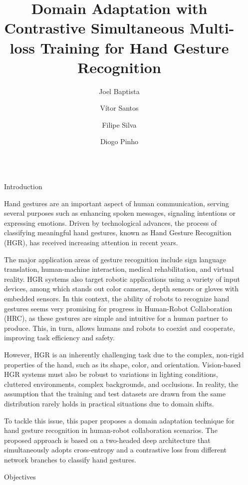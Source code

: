 \documentclass[final]{beamer}
\title{Domain Adaptation with Contrastive Simultaneous Multi-loss
Training for Hand Gesture Recognition}
\author{Joel Baptista \inst{1} \and Vítor Santos \inst{1} \and Filipe Silva \inst{1} \and Diogo Pinho \inst{2}}
\institute[shortinst]{\inst{1} Institute of Electronics and Informatics Engineering of Aveiro (IEETA) \samelineand \\ \inst{2} Bosch Termotecnologia, S. A.  }
\newlength{\sepwidth}
\newlength{\colwidth}
\newcommand{\separatorcolumn}{\begin{column}{\sepwidth}\end{column}}
\begin{document}
\begin{frame}[t]
\begin{columns}[t]
\separatorcolumn

\begin{column}{\colwidth}

  \begin{block}{Introduction}


    Hand gestures are an important aspect of human communication, serving several purposes 
    such as enhancing spoken messages, signaling intentions or expressing emotions. 
    Driven by technological advances, the process of classifying meaningful hand gestures, 
    known as Hand Gesture Recognition (HGR), has received increasing attention in recent years.
    
    The major application areas of gesture recognition include sign language translation, 
    human-machine interaction, medical rehabilitation, and virtual reality. HGR systems also 
    target robotic applications using a variety of input devices, among which stands out color
    cameras, depth sensors or gloves with embedded sensors. In this context, the ability of 
    robots to recognize hand gestures
    seems very promising for progress in Human-Robot Collaboration (HRC), 
    as these gestures are simple and intuitive for a human partner to produce. This, in turn, allows 
    humans and robots to coexist and cooperate, improving task efficiency and safety.


    However, HGR is an inherently challenging task due to the complex, non-rigid properties of the hand, 
    such as its shape, color, and orientation. Vision-based HGR systems must also be robust to variations 
    in lighting conditions, cluttered environments, complex backgrounds, and occlusions. In reality, the
    assumption that the training and test datasets are drawn from the same distribution rarely holds in
    practical situations due to domain shifts.
    
    To tackle this issue, this paper proposes a domain adaptation technique for hand gesture recognition in 
    human-robot collaboration scenarios. The proposed approach is based on a two-headed 
    deep architecture that simultaneously adopts cross-entropy and a contrastive loss from
    different network branches to classify hand gestures.

  \end{block}

  \begin{block}{Objectives}


\end{block}
\end{column}
\end{columns}
\end{frame}
\end{document}

